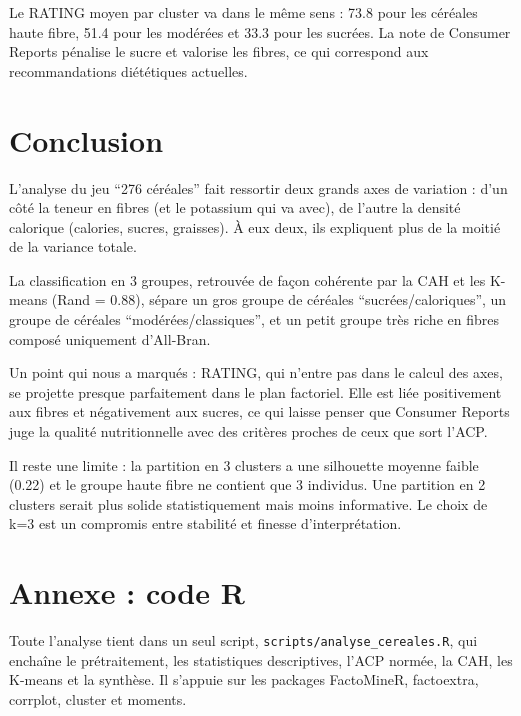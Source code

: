 \documentclass[
]{article}
\begin{document}
Le RATING moyen par cluster va dans le même sens : 73.8 pour les
céréales haute fibre, 51.4 pour les modérées et 33.3 pour les sucrées.
La note de Consumer Reports pénalise le sucre et valorise les fibres, ce
qui correspond aux recommandations diététiques actuelles.

\section{Conclusion}\label{conclusion}

L'analyse du jeu ``276 céréales'' fait ressortir deux grands axes de
variation : d'un côté la teneur en fibres (et le potassium qui va avec),
de l'autre la densité calorique (calories, sucres, graisses). À eux
deux, ils expliquent plus de la moitié de la variance totale.

La classification en 3 groupes, retrouvée de façon cohérente par la CAH
et les K-means (Rand = 0.88), sépare un gros groupe de céréales
``sucrées/caloriques'', un groupe de céréales ``modérées/classiques'',
et un petit groupe très riche en fibres composé uniquement d'All-Bran.

Un point qui nous a marqués : RATING, qui n'entre pas dans le calcul des
axes, se projette presque parfaitement dans le plan factoriel. Elle est
liée positivement aux fibres et négativement aux sucres, ce qui laisse
penser que Consumer Reports juge la qualité nutritionnelle avec des
critères proches de ceux que sort l'ACP.

Il reste une limite : la partition en 3 clusters a une silhouette
moyenne faible (0.22) et le groupe haute fibre ne contient que 3
individus. Une partition en 2 clusters serait plus solide
statistiquement mais moins informative. Le choix de k=3 est un compromis
entre stabilité et finesse d'interprétation.

\section{Annexe : code R}\label{annexe-code-r}

Toute l'analyse tient dans un seul script,
\texttt{scripts/analyse\_cereales.R}, qui enchaîne le prétraitement, les
statistiques descriptives, l'ACP normée, la CAH, les K-means et la
synthèse. Il s'appuie sur les packages FactoMineR, factoextra, corrplot,
cluster et moments.
\end{document}
